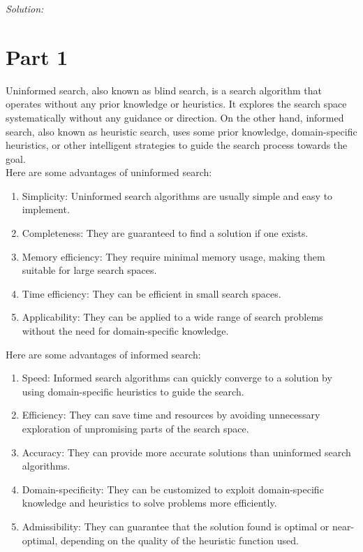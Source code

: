 \documentclass[a4paper, 11pt]{article}
\newenvironment{solution}
    {\textit{Solution:}}
    {}
\begin{document}
{\begin{solution}
\section*{\small Part 1}
Uninformed search, also known as blind search, is a search algorithm that operates without any prior knowledge or heuristics. It explores the search space systematically without any guidance or direction. On the other hand, informed search, also known as heuristic search, uses some prior knowledge, domain-specific heuristics, or other intelligent strategies to guide the search process towards the goal.\\
Here are some advantages of uninformed search:
\begin{enumerate}
\item Simplicity: Uninformed search algorithms are usually simple and easy to implement.
\item Completeness: They are guaranteed to find a solution if one exists.
\item Memory efficiency: They require minimal memory usage, making them suitable for large search spaces.
\item Time efficiency: They can be efficient in small search spaces.
\item Applicability: They can be applied to a wide range of search problems without the need for domain-specific knowledge.
\end{enumerate}
Here are some advantages of informed search:
\begin{enumerate}
	\item Speed: Informed search algorithms can quickly converge to a solution by using domain-specific heuristics to guide the search.
	\item Efficiency: They can save time and resources by avoiding unnecessary exploration of unpromising parts of the search space.
	\item Accuracy: They can provide more accurate solutions than uninformed search algorithms.
	\item Domain-specificity: They can be customized to exploit domain-specific knowledge and heuristics to solve problems more efficiently.
	\item Admissibility: They can guarantee that the solution found is optimal or near-optimal, depending on the quality of the heuristic function used.
\end{enumerate}

\end{solution}}
\end{document}
